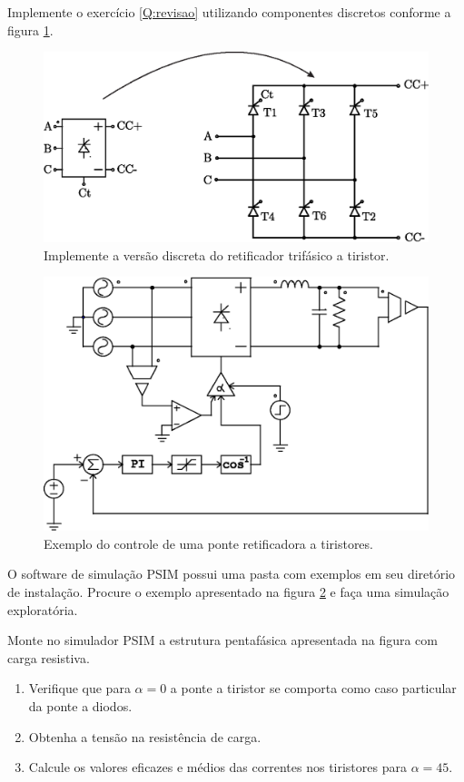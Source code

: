 \documentclass[11pt]{utfpr-exam}
\begin{document}
\begin{questions}
			
			
			
			
			
	
				
				\question[06]
				\label{Q:perunit}
	Implemente o exercício \ref{Q:revisao} utilizando componentes discretos conforme a figura \ref{fig:TiristorDiscreto}.
	
	\begin{figure}[!h]
	\centering
	\includegraphics[width=0.7\linewidth]{figuras/TiristorDiscreto}
	\caption{Implemente a versão discreta do retificador trifásico a tiristor.}
	\label{fig:TiristorDiscreto}
	\end{figure}
	

				
							
				\question[07]
				\label{Q:ExPSIM}
				
				
		\begin{figure}[!h]
	\centering
	\includegraphics[width=0.7\linewidth]{figuras/ExPSIM}
	\caption{Exemplo do controle de uma ponte retificadora a tiristores.}
	\label{fig:ExPSIM}
	\end{figure}
			
	O software de simulação PSIM possui uma pasta com exemplos em seu diretório de instalação. Procure o exemplo apresentado na figura \ref{fig:ExPSIM}	e faça uma simulação exploratória.		
				

				
				
				
				\question[8]
				\label{Q:Desafio}
		Monte no simulador PSIM a estrutura pentafásica apresentada na figura com carga resistiva.
		\begin{enumerate}
			\item Verifique que para $\alpha = 0$ a ponte a tiristor se comporta como caso particular da ponte a diodos.
			\item Obtenha a tensão na resistência de carga.
			\item Calcule os valores eficazes e médios das correntes nos tiristores para $\alpha=45$.
		\end{enumerate}
		

\end{questions}
\end{document}
